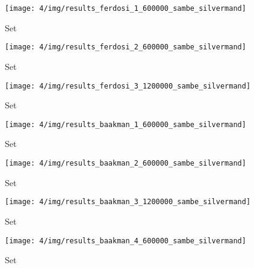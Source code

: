
\begin{subfigure}{0.3\textwidth}
	\centering
	\texttt{[image: 4/img/results\_ferdosi\_1\_600000\_sambe\_silvermand]}
	\caption{Set \ferdosiOne}
	\label{fig:4:simulated:datasets:sambe:ferdosi1}
\end{subfigure}
\begin{subfigure}{0.3\textwidth}
	\centering
	\texttt{[image: 4/img/results\_ferdosi\_2\_600000\_sambe\_silvermand]}
	\caption{Set \ferdosiTwo}
	\label{fig:4:simulated:datasets:sambe:ferdosi2}
\end{subfigure}	
\begin{subfigure}{0.3\textwidth}
	\centering
	\texttt{[image: 4/img/results\_ferdosi\_3\_1200000\_sambe\_silvermand]}
	\caption{Set \ferdosiThree}
	\label{fig:4:simulated:datasets:sambe:ferdosi3}
\end{subfigure}		
\begin{subfigure}{0.3\textwidth}
	\centering
	\texttt{[image: 4/img/results\_baakman\_1\_600000\_sambe\_silvermand]}
	\caption{Set \baakmanOne}
	\label{fig:4:simulated:datasets:sambe:baakman1}
\end{subfigure}
\begin{subfigure}{0.3\textwidth}
	\centering
	\texttt{[image: 4/img/results\_baakman\_2\_600000\_sambe\_silvermand]}
	\caption{Set \baakmanTwo}
	\label{fig:4:simulated:datasets:sambe:baakman2}
\end{subfigure}	
\begin{subfigure}{0.3\textwidth}
	\centering
	\texttt{[image: 4/img/results\_baakman\_3\_1200000\_sambe\_silvermand]}
	\caption{Set \baakmanThree}
	\label{fig:4:simulated:datasets:sambe:baakman3}
\end{subfigure}			
\begin{subfigure}{0.3\textwidth}
	\centering
	\texttt{[image: 4/img/results\_baakman\_4\_600000\_sambe\_silvermand]}
	\caption{Set \baakmanFour}
	\label{fig:4:simulated:datasets:sambe:baakman4}
\end{subfigure}	
